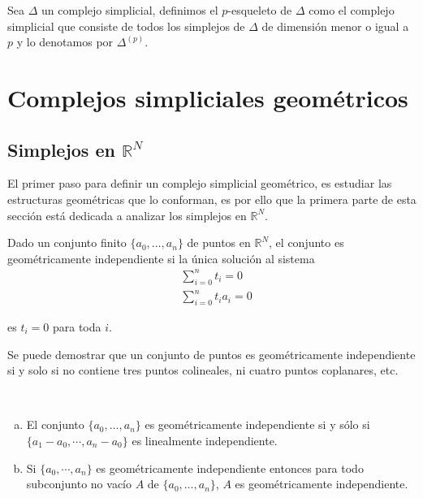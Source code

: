 \begin{Defi}
Sea $\Delta$ un complejo simplicial, definimos el $p$-esqueleto de $\Delta$ como el complejo simplicial que consiste de todos los simplejos de $\Delta$ de dimensión menor o igual a $p$ y lo denotamos por $\Delta^{(p)}$.
\end{Defi}

\section{Complejos simpliciales geométricos}
\subsection{Simplejos en $\mathbb{R}^N$}  
El primer paso para definir un complejo simplicial geométrico, es estudiar las estructuras geométricas que lo conforman, es por ello que la primera parte de esta sección está dedicada a analizar los simplejos en $\mathbb{R}^N$.           
\begin{Defi}
Dado un conjunto finito $\{a_0,\ldots,a_n\}$ de puntos en $\mathbb{R}^{N}$, el conjunto es geométricamente independiente si la única solución al sistema 
\begin{equation}\label{s1}
    \begin{split}
     &\sum_{i=0}^{n}t_{i} = 0 \\
     &\sum_{i=0}^{n}t_{i}a_{i} = 0   
    \end{split}
\end{equation}

es $t_i = 0$ para toda $i$.
\end{Defi}

Se puede demostrar que un conjunto de puntos es geométricamente
independiente si y solo si no contiene tres puntos colineales, ni
cuatro puntos coplanares, etc.

\begin{Teo}
~\begin{enumerate}[(a)]
    \item El conjunto $\{a_0,\ldots,a_n\}$ es geométricamente independiente si y sólo si $\{a_1-a_0,\cdots,a_n-a_0\}$ es linealmente independiente.
    \item Si $\{a_0,\cdots,a_n\}$ es geométricamente independiente entonces para todo subconjunto no vacío $A$ de $\{a_0,\ldots,a_n\}$, $A$ es geométricamente independiente.
\end{enumerate}
\end{Teo}

